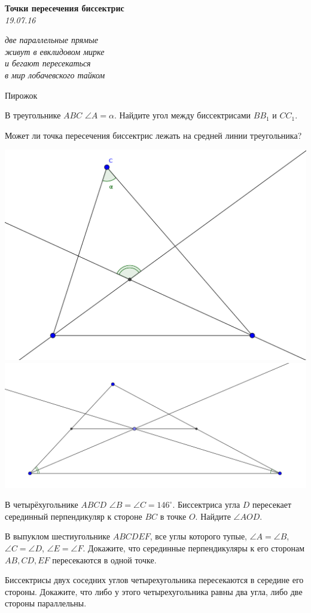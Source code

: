 \renewcommand{\baselinestretch}{0.8}
\parskip

\begin{center}
\textbf{\Large Точки пересечения биссектрис}\\
\textit{19.07.16}
\end{center}

\epigraph{\it две параллельные прямые\\
живут в евклидовом мирке\\
и бегают пересекаться\\
в мир лобачевского тайком}{Пирожок}

\begin{problems}
\item В треугольнике $ABC$ $\angle A=\alpha$. Найдите угол между биссектрисами $BB_1$ и $CC_1$.

\item Может ли точка пересечения биссектрис лежать на средней линии треугольника?

\begin{center}
	\includegraphics[width=.45\textwidth]{incen01}
	\includegraphics[width=.45\textwidth]{incen02}
\end{center}

\item В четырёхугольнике $ABCD$ $\angle B=\angle C=146^{\circ}$. Биссектриса угла $D$ пересекает серединный перпендикуляр к стороне $BC$ в точке $O$. Найдите $\angle AOD$.

\item В выпуклом шестиугольнике $ABCDEF$, все углы которого тупые, $\angle A=\angle B$, $\angle C=\angle D$, $\angle E=\angle F$. Докажите, что серединные перпендикуляры к его сторонам $AB, CD, EF$ пересекаются в одной точке.

\item Биссектрисы двух соседних углов четырехугольника пересекаются в середине его стороны. Докажите, что либо у этого четырехугольника равны два угла, либо две стороны параллельны. 


\end{problems}
